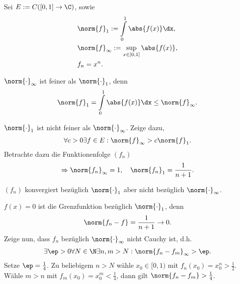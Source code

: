 \begin{bsp}
\label{bsp:1:10}
Sei $E:= C([0,1]\to\C)$, sowie
\begin{align*}
&\norm{f}_1 := \int\limits_0^1 \abs{f(x)}\dx,\\
&\norm{f}_\infty := \sup\limits_{x\in[0,1]} \abs{f(x)},\\
&f_n = x^n.
\end{align*}
\begin{bspenum}
  \item $\norm{\cdot}_\infty$ ist feiner als $\norm{\cdot}_1$, denn
\begin{align*}
\norm{f}_1 = \int\limits_0^1 \abs{f(x)}\dx \le \norm{f}_\infty.
\end{align*}
\item $\norm{\cdot}_1$ ist nicht feiner als $\norm{\cdot}_\infty$. Zeige dazu,
\begin{align*}
\forall c > 0 \exists f\in E : \norm{f}_\infty > c\norm{f}_1. 
\end{align*}
Betrachte dazu die Funktionenfolge $(f_n)$
\begin{align*}
\Rightarrow \norm{f_n}_\infty = 1,\quad \norm{f_n}_1 =
\frac{1}{n+1}.
\end{align*}
\item $(f_n)$ konvergiert bezüglich $\norm{\cdot}_1$ aber nicht bezüglich
$\norm{\cdot}_\infty$.

$f(x) = 0$ ist die Grenzfunktion bezüglich $\norm{\cdot}_1$, denn
\begin{align*}
\norm{f_n-f} = \frac{1}{n+1}\to 0.
\end{align*}
Zeige nun, dass $f_n$ bezüglich $\norm{\cdot}_\infty$ nicht Cauchy ist, d.h.
\begin{align*}
\exists \ep > 0 \forall N\in\N \exists n,m > N : \norm{f_n-f_m}_\infty > \ep.
\end{align*}
Setze $\ep =\frac{1}{4}$. Zu beliebigem $n>N$ wähle $x_0\in[0,1)$ mit $f_n(x_0)
= x_0^n > \frac{1}{2}$. Wähle $m>n$ mit $f_m(x_0) = x_0^m < \frac{1}{4}$, dann
gilt $\norm{f_n-f_m} > \frac{1}{4}$.\bsphere
\end{bspenum}
\end{bsp}

